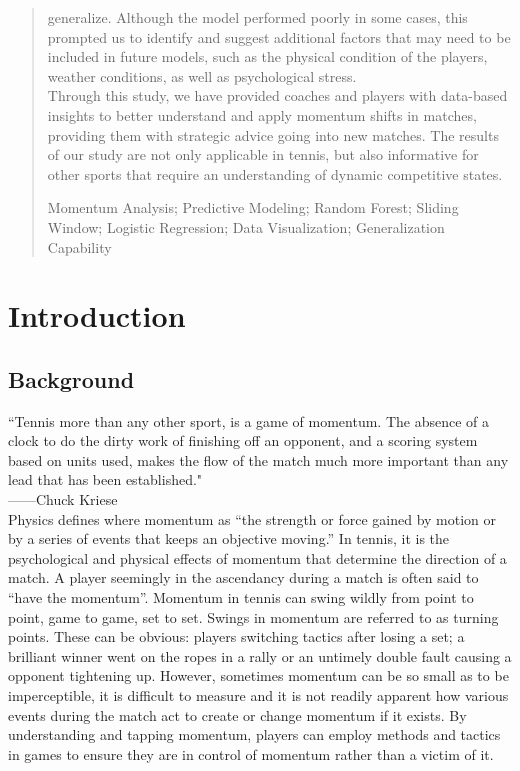 \documentclass{mcmthesis}
\begin{document}
\begin{abstract}
    generalize. Although the model performed poorly in some cases, this prompted us to identify and
    suggest additional factors that may need to be included in future models, such as the physical
    condition of the players, weather conditions, as well as psychological stress. \\
    Through this study, we have provided coaches and players with data-based insights to better
    understand and apply momentum shifts in matches, providing them with strategic advice going
    into new matches. The results of our study are not only applicable in tennis, but also informative
    for other sports that require an understanding of dynamic competitive states.
\begin{keywords}
    Momentum Analysis; Predictive Modeling; Random Forest; Sliding Window; Logistic Regression;
    Data Visualization; Generalization Capability
\end{keywords}
\end{abstract}
\maketitle

\tableofcontents
\thispagestyle{empty}

\newpage
\section{Introduction}

\subsection{Background}%
“Tennis more than any other sport, is a game of momentum. The absence of a clock to do the dirty
work of finishing off an opponent, and a scoring system based on units used, makes the flow of the
match much more important than any lead that has been established."\\
 ——Chuck Kriese\\
Physics defines where momentum as “the strength or force gained by motion or by a series of events that keeps an objective moving.” \cite{1} In tennis, it is the psychological and physical effects
of momentum that determine the direction of a match. A player seemingly in the ascendancy
during a match is often said to “have the momentum”. Momentum in tennis can swing wildly from
point to point, game to game, set to set. Swings in momentum are referred to as turning points. These can be obvious: players switching tactics after losing a set; a brilliant winner went on the
ropes in a rally or an untimely double fault causing a opponent tightening up. However, sometimes momentum can be so small as to be imperceptible, it is difficult to
measure and it is not readily apparent how various events during the match act to create or change
momentum if it exists. By understanding and tapping momentum, players can employ methods
and tactics in games to ensure they are in control of momentum rather than a victim of it.
\end{document}
